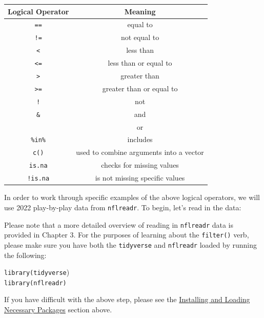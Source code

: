 \documentclass[
  letterpaper,
]{krantz}
\begin{document}
\begin{longtable}[]{@{}cc@{}}
\toprule\noalign{}
Logical Operator & Meaning \\
\midrule\noalign{}
\endhead
\bottomrule\noalign{}
\endlastfoot
\texttt{==} & equal to \\
\texttt{!=} & not equal to \\
\texttt{\textless{}} & less than \\
\texttt{\textless{}=} & less than or equal to \\
\texttt{\textgreater{}} & greater than \\
\texttt{\textgreater{}=} & greater than or equal to \\
\texttt{!} & not \\
\texttt{\&} & and \\
\texttt{\textbar{}} & or \\
\texttt{\%in\%} & includes \\
\texttt{c()} & used to combine arguments into a vector \\
\texttt{is.na} & checks for missing values \\
\texttt{!is.na} & is not missing specific values \\
\end{longtable}

In order to work through specific examples of the above logical
operators, we will use 2022 play-by-play data from \texttt{nflreadr}. To
begin, let's read in the data:

\begin{tcolorbox}[enhanced jigsaw, left=2mm, toprule=.15mm, opacitybacktitle=0.6, leftrule=.75mm, bottomrule=.15mm, colbacktitle=quarto-callout-note-color!10!white, breakable, colback=white, bottomtitle=1mm, toptitle=1mm, title=\textcolor{quarto-callout-note-color}{\faInfo}\hspace{0.5em}{Note}, coltitle=black, titlerule=0mm, arc=.35mm, opacityback=0, colframe=quarto-callout-note-color-frame, rightrule=.15mm]

Please note that a more detailed overview of reading in
\texttt{nflreadr} data is provided in Chapter 3. For the purposes of
learning about the \texttt{filter()} verb, please make sure you have
both the \texttt{tidyverse} and \texttt{nflreadr} loaded by running the
following:

\texttt{library(tidyverse})\\
\texttt{library(nflreadr)}

If you have difficult with the above step, please see the
\protect\hyperlink{installing-and-loading-necessary-packages}{Installing
and Loading Necessary Packages} section above.

\end{tcolorbox}
\end{document}
